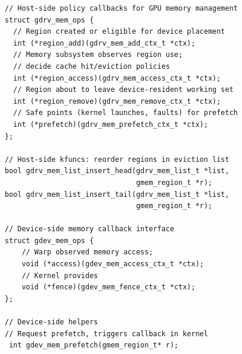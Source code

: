 \begin{verbatim}
// Host-side policy callbacks for GPU memory management
struct gdrv_mem_ops {
  // Region created or eligible for device placement
  int (*region_add)(gdrv_mem_add_ctx_t *ctx);
  // Memory subsystem observes region use;
  // decide cache hit/eviction policies
  int (*region_access)(gdrv_mem_access_ctx_t *ctx);
  // Region about to leave device-resident working set
  int (*region_remove)(gdrv_mem_remove_ctx_t *ctx);
  // Safe points (kernel launches, faults) for prefetch
  int (*prefetch)(gdrv_mem_prefetch_ctx_t *ctx);
};

// Host-side kfuncs: reorder regions in eviction list
bool gdrv_mem_list_insert_head(gdrv_mem_list_t *list,
                               gmem_region_t *r);
bool gdrv_mem_list_insert_tail(gdrv_mem_list_t *list,
                               gmem_region_t *r);

// Device-side memory callback interface
struct gdev_mem_ops {
    // Warp observed memory access;
    void (*access)(gdev_mem_access_ctx_t *ctx);
    // Kernel provides
    void (*fence)(gdev_mem_fence_ctx_t *ctx);
};

// Device-side helpers
// Request prefetch, triggers callback in kernel
 int gdev_mem_prefetch(gmem_region_t* r);
\end{verbatim}





